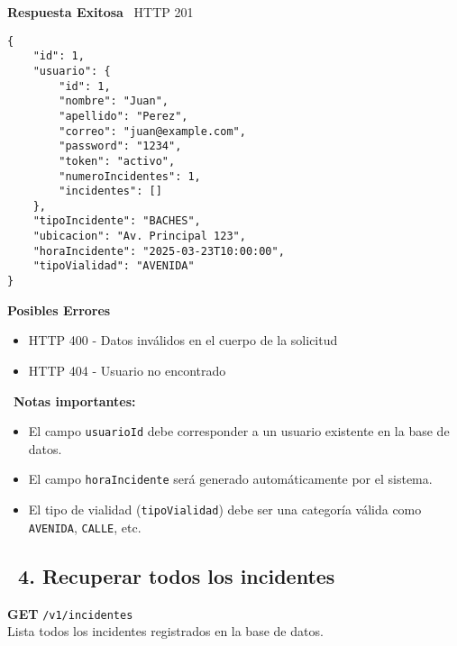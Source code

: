 \begin{tcolorbox}[response]
    \textbf{Respuesta Exitosa} \faCheckCircle\ \textcolor{successColor}{HTTP 201}
    \begin{verbatim}
{
    "id": 1,
    "usuario": {
        "id": 1,
        "nombre": "Juan",
        "apellido": "Perez",
        "correo": "juan@example.com",
        "password": "1234",
        "token": "activo",
        "numeroIncidentes": 1,
        "incidentes": []
    },
    "tipoIncidente": "BACHES",
    "ubicacion": "Av. Principal 123",
    "horaIncidente": "2025-03-23T10:00:00",
    "tipoVialidad": "AVENIDA"
}
    \end{verbatim}
    
    \textbf{Posibles Errores} \faExclamationTriangle
    \begin{itemize}
        \item \textcolor{errorColor}{HTTP 400} - Datos inválidos en el cuerpo de la solicitud
        \item \textcolor{errorColor}{HTTP 404} - Usuario no encontrado
    \end{itemize}
\end{tcolorbox}

\begin{tcolorbox}[notes]
    \faInfoCircle\ \textbf{Notas importantes:}
    \begin{itemize}
        \item El campo \texttt{usuarioId} debe corresponder a un usuario existente en la base de datos.
        \item El campo \texttt{horaIncidente} será generado automáticamente por el sistema.
        \item El tipo de vialidad (\texttt{tipoVialidad}) debe ser una categoría válida como \texttt{AVENIDA}, \texttt{CALLE}, etc.
    \end{itemize}
\end{tcolorbox}

\subsection*{\faServer\ 4. Recuperar todos los incidentes}

\begin{tcolorbox}[endpoint]
    \textbf{GET} \texttt{/v1/incidentes}\\
    Lista todos los incidentes registrados en la base de datos.
\end{tcolorbox}


